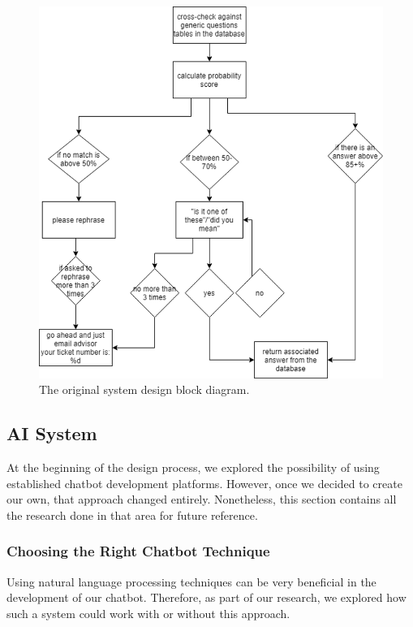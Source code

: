 \documentclass[titlepage, 12pt]{article}
\begin{document}
\begin{figure}[p]
    \centering\includegraphics[width=1\linewidth]{images/original-system-design.png}
    \caption{The original system design block diagram.}
\end{figure}








\subsection{AI System}

At the beginning of the design process, we explored the possibility of using established chatbot development platforms. However, once we decided to create our own, that approach changed entirely. Nonetheless, this section contains all the research done in that area for future reference.

\subsubsection{Choosing the Right Chatbot Technique}

Using natural language processing techniques can be very beneficial in the development of our chatbot. Therefore, as part of our research, we explored how such a system could work with or without this approach.
\end{document}
